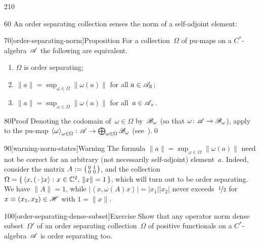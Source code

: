 \begin{parsec}{210}
\begin{point}{60}
An order separating
collection senses the norm 
of a self-adjoint element:
\end{point}
\begin{point}{70}[order-separating-norm]{Proposition}%
For a collection~$\Omega$ of pu-maps on a $C^*$-algebra~$\mathscr{A}$
the following are equivalent.
\begin{enumerate}
\item 
	$\Omega$ is order separating;
\item
	$\|a\|= \sup_{\omega\in\Omega} \left\|\omega(a)\right\|$
	for all $a\in \mathscr{A}_{\mathbb{R}}$;
\item
	$\|a\| = \sup_{\omega\in\Omega} \left\|\omega(a)\right\|$
	for all~$a\in \mathscr{A}_{+}$.
\end{enumerate}
\begin{point}{80}{Proof}%
Denoting the codomain of~$\omega\in\Omega$
by~$\mathscr{B}_\omega$
(so that $\omega\colon \mathscr{A}\to\mathscr{B}_\omega$),
apply~
to the pu-map $\left<\omega\right>_{\omega\in\Omega}\colon 
\mathscr{A}\to\bigoplus_{\omega\in\Omega}
\mathscr{B}_\omega$ (see~).\qed
\end{point}
\begin{point}{90}[warning-norm-states]{Warning}%
The formula
$\|a\|=\sup_{\omega\in\Omega} \|\omega(a)\|$
need not be correct
for an arbitrary (not necessarily self-adjoint)
element~$a$.
Indeed,
consider the matrix $A:=\smash{%
\bigl(\begin{smallmatrix}0&1\\0&0\end{smallmatrix}\bigr)}$,
and the collection $\Omega=\{\,\left<x,(\,\cdot\,)x\right>\colon 
x\in \mathbb{C}^2,\,\|x\|=1\,\}$,
which will turn out to be order separating.
We have $\|A\|=1$,
while $\left| \left<x,\omega(A)x\right>\right|
 =\left|x_1\right|\left|x_2\right|$
 never exceeds~$\nicefrac{1}{2}$
for $x\equiv (x_1,x_2)\in \mathscr{H}$ with $1=\|x\|$.
\end{point}
\end{point}
\begin{point}{100}[order-separating-dense-subset]{Exercise}%
Show that any operator norm dense subset~$\Omega'$
of an order separating collection~$\Omega$
of positive functionals
on a $C^*$-algebra~$\mathscr{A}$
is order separating too.
\end{point}
\end{parsec}
